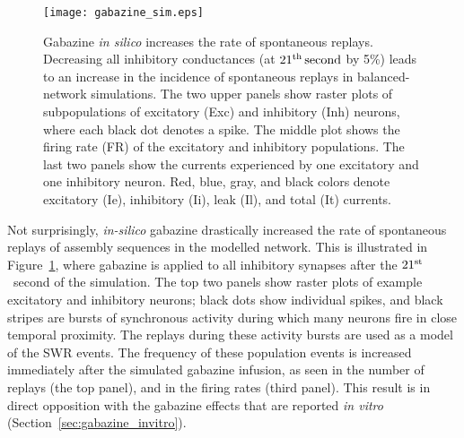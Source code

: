     \begin{figure}
      \center
      \texttt{[image: gabazine\_sim.eps]}
      \caption{
        Gabazine {\it in silico} increases the rate of spontaneous replays.
        Decreasing all inhibitory conductances (at $21^{\rm th}\, \rm second$
        by 5\%) leads to an increase in the incidence of spontaneous replays in
        balanced-network simulations. The two upper panels show raster plots of
        subpopulations of excitatory (Exc) and inhibitory (Inh) neurons, where
        each black dot denotes a spike. The middle plot shows the firing rate
        (FR) of the excitatory and inhibitory populations. The last two panels
        show the currents experienced by one excitatory and one inhibitory
        neuron. Red, blue, gray, and black colors denote excitatory (Ie),
        inhibitory (Ii), leak (Il), and total (It) currents.
            }
    \label{fig:gabazine_sim}
    \end{figure}

    Not surprisingly, \textit{in-silico} gabazine drastically increased the rate
    of spontaneous replays of assembly sequences in the modelled network. This
    is illustrated in Figure~\ref{fig:gabazine_sim}, where gabazine is applied
    to all inhibitory synapses after the $21^{\rm st}$~second of the
    simulation. The top two panels show raster plots of example excitatory and
    inhibitory neurons; black dots show individual spikes, and black
    stripes are bursts of synchronous activity during which many neurons fire in
    close temporal proximity. The replays during these activity bursts are used
    as a model of the SWR events. The frequency of these population
    events is increased immediately after the simulated gabazine infusion, as
    seen in the number of replays (the top panel), and in the firing rates
    (third panel). This result is in direct opposition with the gabazine
    effects that are reported \textit{in vitro}
    (Section~\ref{sec:gabazine_invitro}).

